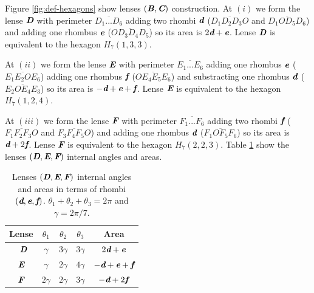 \documentclass[11pt]{article}
\def\mathbi#1{\textbf{\em #1}}
\begin{document}
Figure \ref{fig:def-hexagons} show lenses $(\mathbi{B},\mathbi{C})$ construction.
At $(i)$ we form the lense $\mathbi{D}$ with perimeter $\overline{D_1...D_6}$ adding two rhombi $\mathbi{d}$ ($\overline{D_1D_2D_3O}$ and $\overline{D_1OD_5D_6}$) and adding one rhombus $\mathbi{e}$ ($\overline{OD_3D_4D_5}$) so its area is $2\mathbi{d} + \mathbi{e}$. Lense $\mathbi{D}$ is equivalent to the hexagon $H_7(1,3,3)$.

At $(ii)$ we form the lense $\mathbi{E}$ with perimeter $\overline{E_1...E_6}$ adding one rhombus $\mathbi{e}$ ($\overline{E_1E_2OE_6}$) adding one rhombus $\mathbi{f}$ ($\overline{OE_4E_5E_6}$) and substracting one rhombus $\mathbi{d}$ ($\overline{E_2OE_4E_3}$) so its area is $-\mathbi{d} + \mathbi{e} + \mathbi{f}$. Lense $\mathbi{E}$ is equivalent to the hexagon $H_7(1,2,4)$.

At $(iii)$ we form the lense $\mathbi{F}$ with perimeter $\overline{F_1...F_6}$ adding two rhombi $\mathbi{f}$ ($\overline{F_1F_2F_3O}$ and $\overline{F_3F_4F_5O}$) and adding one rhombus $\mathbi{d}$ ($\overline{F_1OF_5F_6}$) so its area is $\mathbi{d} + 2\mathbi{f}$. Lense $\mathbi{F}$ is equivalent to the hexagon $H_7(2,2,3)$.
Table \ref{tbl:def-lenses-angles} show the lenses $(\mathbi{D},\mathbi{E},\mathbi{F})$ internal angles and areas.

\begin{table}[H]
\begin{center}
\begin{tabular}{|c|c c c| c |} \hline
Lense & $\theta_1$ & $\theta_2$ & $\theta_3$ & Area \\ \hline\
$\mathbi{D}$ & $\gamma$  & $3\gamma$ & $3\gamma$ & $2\mathbi{d} + \mathbi{e}$
\\[0.5ex] \hline
$\mathbi{E}$ & $\gamma$  & $2\gamma$ & $4\gamma$ & $-\mathbi{d} + \mathbi{e} + \mathbi{f}$
\\[0.5ex] \hline
$\mathbi{F}$ & $2\gamma$ & $2\gamma$ & $3\gamma$ & $-\mathbi{d} + 2\mathbi{f}$ 
\\[0.5ex] \hline
\end{tabular}
\caption{Lenses $(\mathbi{D},\mathbi{E},\mathbi{F})$ internal angles and areas in terms of rhombi $(\mathbi{d},\mathbi{e},\mathbi{f})$. $\theta_1+\theta_2+\theta_3 = 2\pi$ and $\gamma = 2\pi/7$.} 
\label{tbl:def-lenses-angles}
\end{center}
\end{table}
\end{document}
